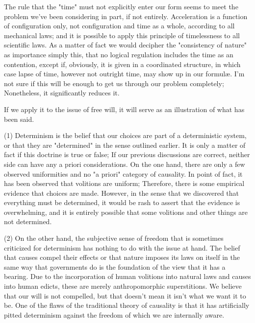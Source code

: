 \documentclass[a4paper,12pt]{book}[2004/02/16]
\theoremstyle{ilemma}
\theoremstyle{itheorem}
\theoremstyle{iother}
\theoremstyle{icorollary}
\theoremstyle{numcorollary}
\theoremstyle{idefinition}
\begin{document}
The rule that the "time" must not explicitly enter our form seems to meet the problem we've been considering in part, if not entirely. Acceleration is a function of configuration only, not configuration and time as a whole, according to all mechanical laws; and it is possible to apply this principle of timelessness to all scientific laws. As a matter of fact we would decipher the "consistency of nature"
as importance simply this, that no logical regulation includes the time as an
contention, except if, obviously, it is given in a coordinated structure, in
which case lapse of time, however not outright time, may show up in
our formulæ. I'm not sure if this will be enough to get us through our problem completely; Nonetheless, it significantly reduces it.

If we apply it to the issue of free will, it will serve as an illustration of what has been said.

(1) Determinism is the belief that our choices are part of a deterministic system, or that they are "determined" in the sense outlined earlier. It is only a matter of fact if this doctrine is true or false; If our previous discussions are correct, neither side can have any a priori considerations. On the one hand, there are only a few observed uniformities and no "a priori" category of causality. In point of fact, it has been observed that volitions are uniform; Therefore, there is some empirical evidence that choices are made. However, in the sense that we discovered that everything must be determined, it would be rash to assert that the evidence is overwhelming, and it is entirely possible that some volitions and other things are not determined.

(2) On the other hand, the subjective sense of freedom that is sometimes criticized for determinism has nothing to do with the issue at hand.
The belief that causes compel their effects or that nature imposes its laws on itself in the same way that governments do is the foundation of the view that it has a bearing. Due to the incorporation of human volitions into natural laws and causes into human edicts, these are merely anthropomorphic superstitions. We believe that our will is not compelled, but that doesn't mean it isn't what we want it to be. One of the flaws of the traditional theory of causality is that it has artificially pitted determinism against the freedom of which we are internally aware.
\end{document}
